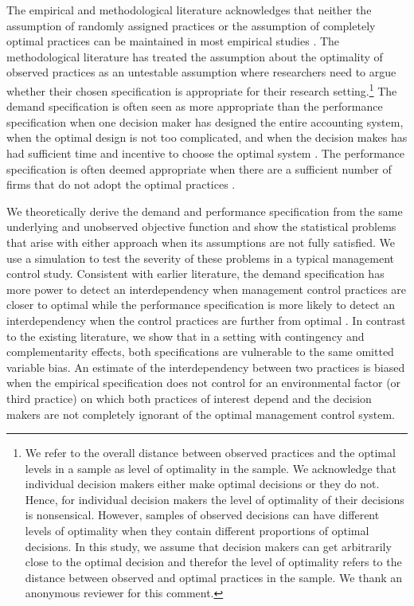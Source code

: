 \documentclass[12pt]{article}
\begin{document}
The empirical and methodological literature acknowledges that neither the assumption of randomly assigned practices or the assumption of completely optimal practices can be maintained in most empirical studies \citep{Brynjolfsson2013ComplementarityOrganizations}. The methodological literature has treated the assumption about the optimality of observed practices as an untestable assumption where researchers need to argue whether their chosen specification is appropriate for their research setting.\footnote{We refer to the overall distance between observed practices and the optimal levels in a sample as level of optimality in the sample. We acknowledge that individual decision makers either make optimal decisions or they do not. Hence, for individual decision makers the level of optimality of their decisions is nonsensical. However, samples of observed decisions can have different levels of optimality when they contain different proportions of optimal decisions. In this study, we assume that decision makers can get arbitrarily close to the optimal decision and therefor the level of optimality refers to the distance between observed and optimal practices in the sample. We thank an anonymous reviewer for this comment.}
The demand specification is often seen as more appropriate than the performance specification when one decision maker has designed the entire accounting system, when the optimal design is not too complicated, and when the decision makes has had sufficient time and incentive to choose the optimal system \citep{Grabner2013, Hofmann2015OrganizationalChoices, Carree2011, Johansson2018}.  The performance specification is often deemed appropriate when there are a sufficient number of firms that do not adopt the optimal practices \citep{Carree2011, Bedford2016}. 

We theoretically derive the demand and performance specification from the same underlying and unobserved objective function and show the statistical problems that arise with either approach when its assumptions are not fully satisfied. We use a simulation to test the severity of these problems in a typical management control study. Consistent with earlier literature, the demand specification has more power to detect an interdependency when management control practices are closer to optimal while the performance specification is more likely to detect an interdependency when the control practices are further from optimal . In contrast to the existing literature, we show that in a setting with contingency and complementarity effects, both specifications are vulnerable to the same omitted variable bias. An estimate of the interdependency between two practices is biased when the empirical specification does not control for an environmental factor (or third practice) on which both practices of interest depend and the decision makers are not completely ignorant of the optimal management control system. 
\end{document}
